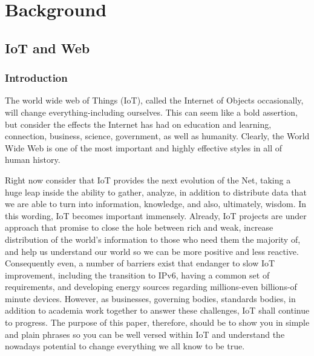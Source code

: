 \chead{}
\chapter{Background}

\section{IoT and Web}

\subsection{Introduction}
The world wide web of Things (IoT), called the Internet of Objects occasionally, will change everything-including ourselves. This can seem like a bold assertion, but consider the effects the Internet has had on education and learning, connection, business, science, government, as well as humanity. Clearly, the World Wide Web is one of the most important and highly effective styles in all of human history.

Right now consider that IoT provides the next evolution of the Net, taking a huge leap inside the ability to gather, analyze, in addition to distribute data that we are able to turn into information, knowledge, and also, ultimately, wisdom. In this wording, IoT becomes important immensely. Already, IoT projects are under approach that promise to close the hole between rich and weak, increase distribution of the world’s information to those who need them the majority of, and help us understand our world so we can be more positive and less reactive. Consequently even, a number of barriers exist that endanger to slow IoT improvement, including the transition to IPv6, having a common set of requirements, and developing energy sources regarding millions-even billions-of minute devices. However, as businesses, governing bodies, standards bodies, in addition to academia work together to answer these challenges, IoT shall continue to progress. The purpose of this paper, therefore, should be to  show you in simple and plain phrases so you can be well versed within IoT and understand the  nowadays potential to change everything we all know to be true.

